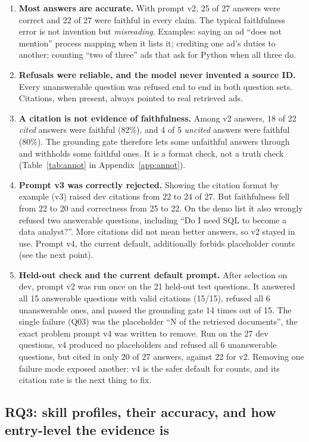 \begin{enumerate}
  \item \textbf{Most answers are accurate.} With prompt v2, 25 of 27 answers were correct and 22 of 27 were faithful in every claim. The typical faithfulness error is not invention but \emph{misreading}. Examples: saying an ad ``does not mention'' process mapping when it lists it; crediting one ad's duties to another; counting ``two of three'' ads that ask for Python when all three do.
  \item \textbf{Refusals were reliable, and the model never invented a source ID.} Every unanswerable question was refused end to end in both question sets. Citations, when present, always pointed to real retrieved ads.
  \item \textbf{A citation is not evidence of faithfulness.} Among v2 answers, 18 of 22 \emph{cited} answers were faithful (82\%), and 4 of 5 \emph{uncited} answers were faithful (80\%). The grounding gate therefore lets some unfaithful answers through and withholds some faithful ones. It is a format check, not a truth check (Table~\ref{tab:annot} in Appendix~\ref{app:annot}).
  \item \textbf{Prompt v3 was correctly rejected.} Showing the citation format by example (v3) raised dev citations from 22 to 24 of 27. But faithfulness fell from 22 to 20 and correctness from 25 to 22. On the demo list it also wrongly refused two answerable questions, including ``Do I need SQL to become a data analyst?''. More citations did not mean better answers, so v2 stayed in use. Prompt v4, the current default, additionally forbids placeholder counts (see the next point).
  \item \textbf{Held-out check and the current default prompt.} After selection on dev, prompt v2 was run once on the 21 held-out test questions. It answered all 15 answerable questions with valid citations (15/15), refused all 6 unanswerable ones, and passed the grounding gate 14 times out of 15. The single failure (Q03) was the placeholder ``N of the retrieved documents'', the exact problem prompt v4 was written to remove. Run on the 27 dev questions, v4 produced no placeholders and refused all 6 unanswerable questions, but cited in only 20 of 27 answers, against 22 for v2. Removing one failure mode exposed another: v4 is the safer default for counts, and its citation rate is the next thing to fix.
\end{enumerate}

\subsection{RQ3: skill profiles, their accuracy, and how entry-level the evidence is}\label{sec:rq3}

